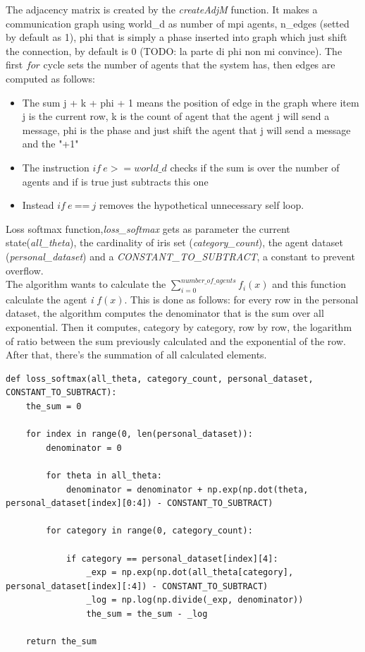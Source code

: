 \documentclass[a4paper,11pt,oneside]{book}
\begin{document}
The adjacency matrix is created by the \textit{createAdjM} function. It makes a communication graph using world\_d as number of
mpi agents, n\_edges  (setted by default as 1), phi that is simply a phase inserted into
graph which just shift the connection, by default is 0 (TODO: la parte di phi non mi convince). The first $for$
cycle sets the number of agents that the system has, then edges are
computed as follows:
\begin{itemize}
    \item The sum j + k + phi + 1 means the position of edge in the
    graph where item j is the current row, k is the count of agent 
    that the agent j will send a message, phi is the phase and just
    shift the agent that j will send a message and the "+1" 

    \item The instruction $ if \ e >= world\_d $  checks if the sum is over the number of
    agents and if is true just subtracts this one

    \item Instead $ if \ e \ $==$ \  j $ removes the hypothetical unnecessary self loop.
\end{itemize}


Loss softmax function,\textit{loss\_softmax} gets as parameter the current state(\textit{all\_theta}), the cardinality of
iris set (\textit{category\_count}), the agent dataset (\textit{personal\_dataset}) and a \textit{CONSTANT\_TO\_SUBTRACT}, a
constant to prevent overflow.\\
The algorithm wants to calculate the $\displaystyle\sum_{i=0}^{number\_of\_agents} f_{i}(x)$ and this function calculate the
agent \textit{i} $f(x)$. This is done as follows: for every row in the personal dataset, the algorithm computes the
denominator that is the sum over all exponential. Then it computes, category by category, row by row, the logarithm of ratio
between the sum previously calculated and the exponential of the row. After that, there's the summation of all calculated
elements.

\begin{lstlisting}
def loss_softmax(all_theta, category_count, personal_dataset, CONSTANT_TO_SUBTRACT):
    the_sum = 0

    for index in range(0, len(personal_dataset)):
        denominator = 0

        for theta in all_theta:
            denominator = denominator + np.exp(np.dot(theta, personal_dataset[index][0:4]) - CONSTANT_TO_SUBTRACT)

        for category in range(0, category_count):

            if category == personal_dataset[index][4]:
                _exp = np.exp(np.dot(all_theta[category], personal_dataset[index][:4]) - CONSTANT_TO_SUBTRACT)
                _log = np.log(np.divide(_exp, denominator))
                the_sum = the_sum - _log

    return the_sum
\end{lstlisting}
\end{document}
